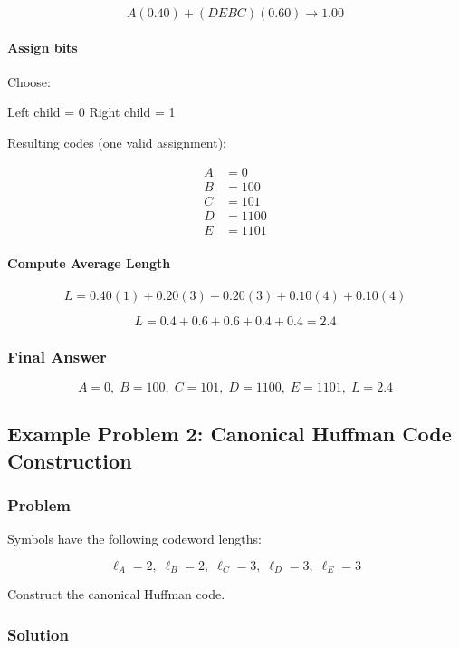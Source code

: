 \documentclass{AnantDocumentation}
\begin{document}
\[
A(0.40) + (DEBC)(0.60) \rightarrow 1.00
\]

\paragraph{Assign bits}

Choose:

Left child = 0  
Right child = 1  

Resulting codes (one valid assignment):

\[
\begin{aligned}
A &= 0 \\
B &= 100 \\
C &= 101 \\
D &= 1100 \\
E &= 1101
\end{aligned}
\]

\paragraph{Compute Average Length}

\[
L = 0.40(1) + 0.20(3) + 0.20(3) + 0.10(4) + 0.10(4)
\]

\[
L = 0.4 + 0.6 + 0.6 + 0.4 + 0.4 = 2.4
\]

\subsubsection*{Final Answer}

\[
\boxed{
A=0,\; B=100,\; C=101,\; D=1100,\; E=1101,\; L=2.4
}
\]

\subsection{Example Problem 2: Canonical Huffman Code Construction}

\subsubsection*{Problem}

Symbols have the following codeword lengths:

\[
\ell_A=2,\; \ell_B=2,\; \ell_C=3,\; \ell_D=3,\; \ell_E=3
\]

Construct the canonical Huffman code.

\subsubsection*{Solution}
\end{document}
